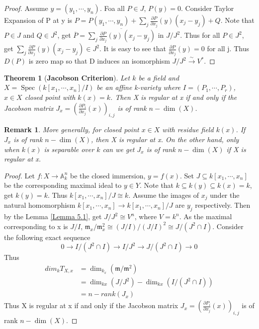 \documentclass{ctexart}
\newtheorem{remark}{Remark}[section]
\newtheorem{theorem}{Theorem}[section]
\newcommand{\spec}{\operatorname{Spec}}
\begin{document}
\begin{proof}
    Assume $y = (y_{1}, \cdots, y_{n})$.
    Foa all $P\in J$, $P(y) = 0$.
    Consider Taylor Expansion of P at y is $P = P(y_{1}, \cdots, y_{n}) + \sum_{j} \frac{\partial P}{\partial x_{j}}(y)(x_{j} - y_{j}) + Q$.
    Note that $P\in J$ and $Q\in J^{2}$, get $\overline{P} = \overline{\sum_{j} \frac{\partial P}{\partial x_{j}}(y)(x_{j} - y_{j})}$ in $J/J^{2}$.
    Thus for all $P\in J^{2}$, get $\sum_{j} \frac{\partial P}{\partial x_{j}}(y)(x_{j} - y_{j})\in J^{2}$.
    It is easy to see that $\frac{\partial P}{\partial x_{j}}(y) = 0$ for all j.
    Thus $D(P)$ is zero map so that D induces an isomorphism $J/J^{2} \overset{\sim}{\longrightarrow} V^{\ast}$.
\end{proof}
\begin{theorem}[\textbf{Jacobson Criterion}]
    Let $k$ be a field and $X = \spec(k[x_{1}, \cdots, x_{n}]/I)$ be an affine k-variety where $I = (P_{1}, \cdots, P_{r})$, $x\in X$ closed point with $k(x) = k$.
    Then X is regular at x if and only if the Jacobson matrix $J_{x} = (\frac{\partial P_{i}}{\partial x_{j}}(x))_{i,j}$ is of rank $n - \dim(X)$.
    \label{Theorem 5.3}
\end{theorem}
\begin{remark}
    More generally, for closed point $x\in X$ with residue field $k(x)$.
    If $J_{x}$ is of rank $n - \dim(X)$, then X is regular at x.
    On the other hand, only when $k(x)$ is separable over $k$ can we get $J_{x}$ is of rank $n - \dim(X)$ if X is regular at x.
\end{remark}
\begin{proof}
    Let $f: X \longrightarrow \mathbb{A}_{k}^{n}$ be the closed immersion, $y = f(x)$.
    Set $J \subseteq k[x_{1}, \cdots, x_{n}]$ be the corresponding maximal ideal to $y\in Y$.
    Note that $k \subseteq k(y) \subseteq k(x) = k$, get $k(y) = k$.
    Thus $k[x_{1}, \cdots, x_{n}]/J \cong k$.
    Assume the images of $x_{j}$ under the natural homomorphism $k[x_{1}, \cdots, x_{n}] \longrightarrow k[x_{1}, \cdots, x_{n}]/J$ are $y_{j}$ respectively.
    Then by the Lemma \ref{Lemma 5.1}, get $J/J^{2} \cong V^{n}$, where $V = k^{n}$.
    As the maximal corresponding to x is $J/I$, $\mathfrak{m}_{x}/\mathfrak{m}_{x}^{2} \cong (J/I)/(J/I)^{2} \cong J/(J^{2} \cap I)$.
    Consider the following exact sequence
    \begin{equation*}
        0 \longrightarrow I/(J^{2} \cap I) \longrightarrow I/J^{2} \longrightarrow J/(J^{2} \cap I) \longrightarrow 0
    \end{equation*}
    Thus 
    \begin{equation*}
        \begin{split}
            dim_{k}{T_{X, x}} & = \dim_{k_{x}}(\mathfrak{m}/\mathfrak{m}^{2}) \\
             & = \dim_{k{x}}(J/J^{2}) - \dim_{k{x}}(I/(J^{2} \cap I)) \\
             & = n - rank(J_{x})
        \end{split}
    \end{equation*}
    Thus X is regular at x if and only if the Jacobson matrix $J_{x} = (\frac{\partial P_{i}}{\partial x_{j}}(x))_{i,j}$ is of rank $n - \dim(X)$.
\end{proof}
\end{document}
